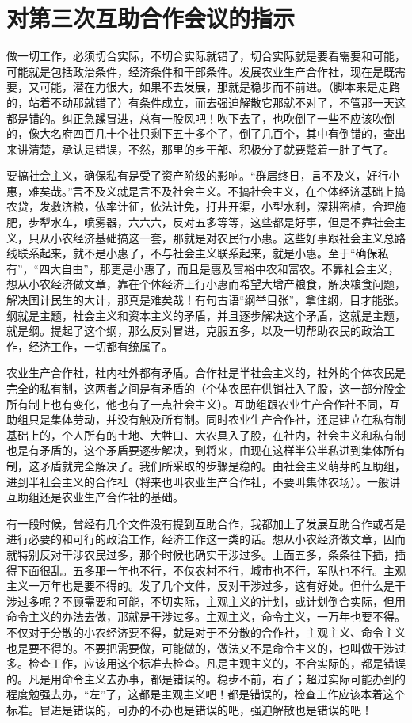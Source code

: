 \section[对第三次互助合作会议的指示（一九五三年十一月五日）]{对第三次互助合作会议的指示}


做一切工作，必须切合实际，不切合实际就错了，切合实际就是要看需要和可能，可能就是包括政治条件，经济条件和干部条件。发展农业生产合作社，现在是既需要，又可能，潜在力很大，如果不去发展，那就是稳步而不前进。（脚本来是走路的，站着不动那就错了）有条件成立，而去强迫解散它那就不对了，不管那一天这都是错的。纠正急躁冒进，总有一股风吧！吹下去了，也吹倒了一些不应该吹倒的，像大名府四百几十个社只剩下五十多个了，倒了几百个，其中有倒错的，查出来讲清楚，承认是错误，不然，那里的乡干部、积极分子就要蹩着一肚子气了。

要搞社会主义，确保私有是受了资产阶级的影响。“群居终日，言不及义，好行小惠，难矣哉。”言不及义就是言不及社会主义。不搞社会主义，在个体经济基础上搞农贷，发救济粮，依率计征，依法计免，打井开渠，小型水利，深耕密植，合理施肥，步犁水车，喷雾器，六六六，反对五多等等，这些都是好事，但是不靠社会主义，只从小农经济基础搞这一套，那就是对农民行小惠。这些好事跟社会主义总路线联系起来，就不是小惠了，不与社会主义联系起来，就是小惠。至于“确保私有”，“四大自由”，那更是小惠了，而且是惠及富裕中农和富农。不靠社会主义，想从小农经济做文章，靠在个体经济上行小惠而希望大增产粮食，解决粮食问题，解决国计民生的大计，那真是难矣哉！有句古语“纲举目张”，拿住纲，目才能张。纲就是主题，社会主义和资本主义的矛盾，并且逐步解决这个矛盾，这就是主题，就是纲。提起了这个纲，那么反对冒进，克服五多，以及一切帮助农民的政治工作，经济工作，一切都有统属了。

农业生产合作社，社内社外都有矛盾。合作社是半社会主义的，社外的个体农民是完全的私有制，这两者之间是有矛盾的（个体农民在供销社入了股，这一部分股金所有制上也有变化，他也有了一点社会主义）。互助组跟农业生产合作社不同，互助组只是集体劳动，并没有触及所有制。同时农业生产合作社，还是建立在私有制基础上的，个人所有的土地、大牲口、大农具入了股，在社内，社会主义和私有制也是有矛盾的，这个矛盾要逐步解决，到将来，由现在这样半公半私进到集体所有制，这矛盾就完全解决了。我们所采取的步骤是稳的。由社会主义萌芽的互助组，进到半社会主义的合作社（将来也叫农业生产合作社，不要叫集体农场）。一般讲互助组还是农业生产合作社的基础。

有一段时候，曾经有几个文件没有提到互助合作，我都加上了发展互助合作或者是进行必要的和可行的政治工作，经济工作这一类的话。想从小农经济做文章，因而就特别反对干涉农民过多，那个时候也确实干涉过多。上面五多，条条往下插，插得下面很乱。五多那一年也不行，不仅农村不行，城市也不行，军队也不行。主观主义一万年也是要不得的。发了几个文件，反对干涉过多，这有好处。但什么是干涉过多呢？不顾需要和可能，不切实际，主观主义的计划，或计划倒合实际，但用命令主义的办法去做，那就是干涉过多。主观主义，命令主义，一万年也要不得。不仅对于分散的小农经济要不得，就是对于不分散的合作社，主观主义、命令主义也是要不得的。不要把需要做，可能做的，做法又不是命令主义的，也叫做干涉过多。检查工作，应该用这个标准去检查。凡是主观主义的，不合实际的，都是错误的。凡是用命令主义去办事，都是错误的。稳步不前，右了；超过实际可能办到的程度勉强去办，“左”了，这都是主观主义吧！都是错误的，检查工作应该本着这个标准。冒进是错误的，可办的不办也是错误的吧，强迫解散也是错误的吧！

